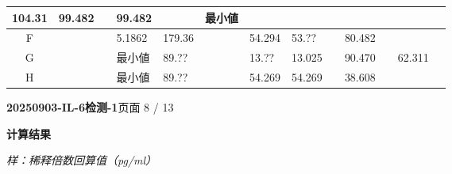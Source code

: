 \documentclass[UTF8,10pt,a4paper,fontset=fandol]{ctexart}
\newcommand{\fieldvalue}[1]{#1}
\begin{document}
\begin{center}
\begin{tabular}{c|p{0.52cm}|p{0.52cm}|p{1.02cm}|p{1.02cm}|p{0.52cm}|p{1.02cm}|p{1.02cm}|p{0.52cm}|p{1.02cm}|p{0.52cm}|p{1.02cm}|p{0.52cm}}
\fieldvalue{\scriptsize 104.31} &
\fieldvalue{\scriptsize 99.482} &
&
\fieldvalue{\scriptsize 99.482} &
& 最小値 &\\ \hline
F & & &
\fieldvalue{\scriptsize 5.1862} &
\fieldvalue{\scriptsize 179.36} &
&
\fieldvalue{\scriptsize 54.294} &
\fieldvalue{\scriptsize 53.??} &
&
\fieldvalue{\scriptsize 80.482} &
& &\\ \hline
G & & &
\fieldvalue{\scriptsize 最小値} &
\fieldvalue{\scriptsize 89.??} &
&
\fieldvalue{\scriptsize 13.??} &
\fieldvalue{\scriptsize 13.025} &
&
\fieldvalue{\scriptsize 90.470} &
&
\fieldvalue{\scriptsize 62.311} &\\ \hline
H & & &
\fieldvalue{\scriptsize 最小値} &
\fieldvalue{\scriptsize 89.??} &
&
\fieldvalue{\scriptsize 54.269} &
\fieldvalue{\scriptsize 54.269} &
&
\fieldvalue{\scriptsize 38.608} &
& &
\end{tabular}
\end{center}


\newpage

\noindent\textbf{20250903-IL-6检测-1}\hfill 页面 8 / 13

\medskip
\noindent\textbf{计算结果}

\noindent\textit{样：稀释倍数回算值（pg/ml）}

\medskip
{}
\end{document}
